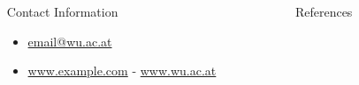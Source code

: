 \documentclass[final]{beamer}
\newlength{\sepmargin}
\newlength{\sepwid}
\newlength{\onecolwid}
\begin{document}
\begin{frame}[t]
\begin{columns}[t]
\begin{column}{\onecolwid}
\begin{block}{ }
                
		\end{block}
      \end{column}
      
      \begin{column}{\sepmargin} \end{column}
      \end{columns} 
       
      \begin{columns}[t] %
      
      \begin{column}{\sepmargin} \end{column}
        \begin{column}{\onecolwid} %
	
                \vspace*{-0.9cm}
				\begin{alertblock}{\large Contact Information}
                \vspace*{-0.5cm}
					\begin{footnotesize}
					\begin{itemize}
						\item \href{mailto:email@wu.ac.at}{email@wu.ac.at}
						\item \href{http://www.example.com/}{www.example.com} - \href{www.wu.ac.at}{www.wu.ac.at}
					\end{itemize}
					\end{footnotesize}	
					
				\end{alertblock}
		    \end{column} %
			\begin{column}{\sepwid}\end{column} %
			\begin{column}{\onecolwid} %
              \begin{block}{\large References}
			  \vspace*{-0.5cm}
              	\nocite{*} %
					{\footnotesize
						}
				\end{block} 
			\end{column} %
            
			\begin{column}{\sepmargin}\end{column} %
            
\end{columns} %


\end{frame} %
	
\end{document}
